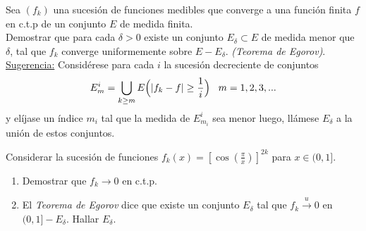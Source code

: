 \documentclass{book}
\newcommand{\nn}{\mathbb{N}}
\begin{document}
\begin{ejer}{} 
Sea $(f_k)$ una sucesión de  funciones medibles que converge a una función finita $f$
en c.t.p de un conjunto $E$ de medida finita. 
\\
Demostrar que para cada $\delta>0$  existe un conjunto
$E_{\delta}\subset E$ de medida menor que $\delta$, tal que $f_k$ converge uniformemente sobre 
$E-E_{\delta}$. 
{\it{(Teorema de Egorov)}}.
\\
\underline{Sugerencia:} Considérese para cada $i$ la 
sucesión decreciente de conjuntos
$$E_m^i=\bigcup_{k\geq m}E\Bigl(|f_k-f|\geq \frac{1}{i}\Bigr) \;\;\;m=1,2,3,...$$
y elíjase un índice $m_i$ tal que la medida de $E_{m_i}^i$ sea menor luego, llámese $E_{\delta}$ a la unión de estos conjuntos.
\end{ejer} 

\begin{ejer}{} 
Considerar la sucesi\'on de funciones $f_k(x)=\left[\cos(\frac{\pi}{x})\right]^{2k}$ para $x \in (0,1]$.
\begin{enumerate}
\item Demostrar que $f_k \to 0$ en c.t.p.
\item El \textit{Teorema de Egorov} dice que existe un conjunto $E_{\delta}$ tal que $f_k \xrightarrow{u} 0$
en $(0,1]-E_{\delta}$. 
Hallar $E_{\delta}$.
\end{enumerate}
\end{ejer}

\end{document}
